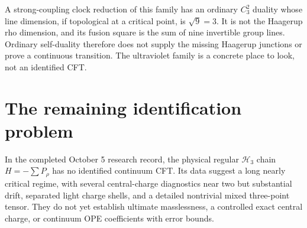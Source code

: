 A strong-coupling clock reduction of this family has an ordinary
$C_3^2$ duality whose line dimension, if topological at a critical
point, is $\sqrt9=3$. It is not the Haagerup rho dimension, and its
fusion square is the sum of nine invertible group lines. Ordinary
self-duality therefore does not supply the missing Haagerup
junctions or prove a continuous transition. The ultraviolet family
is a concrete place to look, not an identified CFT.

\section{The remaining identification problem}

In the completed October 5 research record, the physical regular
$\mathcal H_3$ chain $H=-\sum P_\rho$ has no identified continuum CFT.
Its data suggest a long nearly critical regime, with several
central-charge diagnostics near two but substantial drift,
separated light charge shells, and a detailed nontrivial mixed
three-point tensor. They do not yet establish ultimate
masslessness, a controlled exact central charge, or continuum
OPE coefficients with error bounds.

